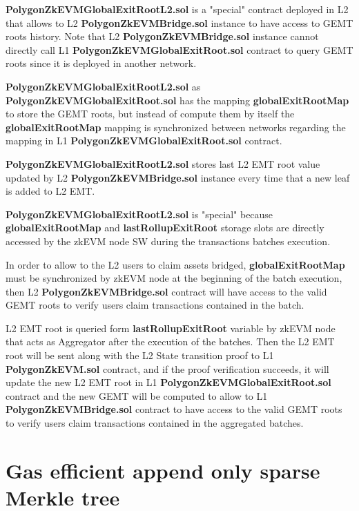 \textbf{PolygonZkEVMGlobalExitRootL2.sol} is a "special" contract deployed in L2 that allows to L2 \textbf{PolygonZkEVMBridge.sol} instance to have access to GEMT roots history. Note that L2 \textbf{PolygonZkEVMBridge.sol} instance cannot directly call L1 \textbf{PolygonZkEVMGlobalExitRoot.sol} contract to query GEMT roots since it is deployed in another network.

\textbf{PolygonZkEVMGlobalExitRootL2.sol} as \textbf{PolygonZkEVMGlobalExitRoot.sol} has the mapping \textbf{globalExitRootMap} to store the GEMT roots, but instead of compute them by itself the \textbf{globalExitRootMap} mapping is synchronized between networks regarding the mapping in L1 \textbf{PolygonZkEVMGlobalExitRoot.sol} contract.

\textbf{PolygonZkEVMGlobalExitRootL2.sol} stores last L2 EMT root value updated by L2 \textbf{PolygonZkEVMBridge.sol} instance every time that a new leaf is added to L2 EMT.

\textbf{PolygonZkEVMGlobalExitRootL2.sol} is "special" because \textbf{globalExitRootMap} and \textbf{lastRollupExitRoot} storage slots are directly accessed by the zkEVM node SW during the transactions batches execution. 

In order to allow to the L2 users to claim assets bridged, \textbf{globalExitRootMap} must be synchronized by zkEVM node at the beginning of the batch execution, then L2 \textbf{PolygonZkEVMBridge.sol} contract will have access to the valid GEMT roots to verify users claim transactions contained in the batch.

L2 EMT root is queried form \textbf{lastRollupExitRoot} variable by zkEVM node that acts as Aggregator after the execution of the batches. Then the L2 EMT root will be sent along with the L2 State transition proof to L1 \textbf{PolygonZkEVM.sol} contract, and if the proof verification succeeds, it will update the new L2 EMT root in L1 \textbf{PolygonZkEVMGlobalExitRoot.sol} contract and the new GEMT will be computed to allow to L1  \textbf{PolygonZkEVMBridge.sol} contract to have access to the valid GEMT roots to verify users claim transactions contained in the aggregated batches.


\appendix

\section{Gas efficient append only sparse Merkle tree}


